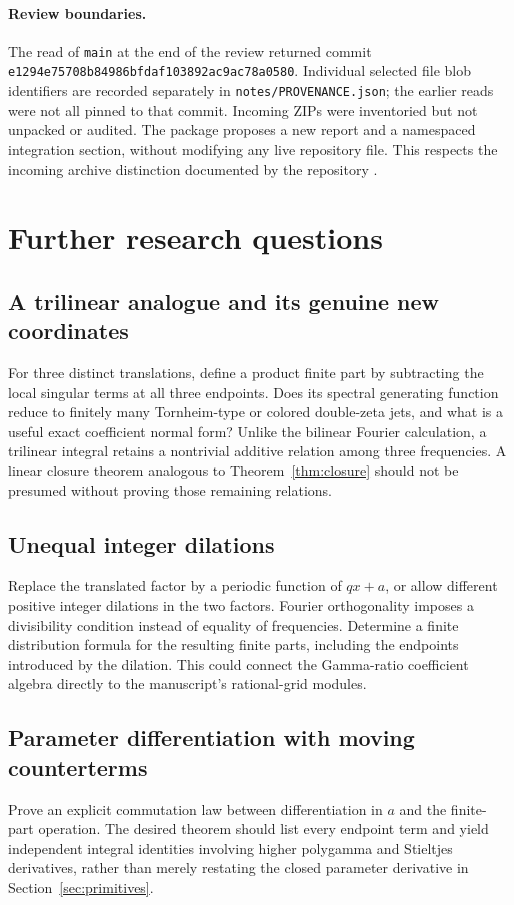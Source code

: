 \documentclass[11pt]{article}
\numberwithin{equation}{section}
\theoremstyle{definition}
\theoremstyle{remark}
\newcommand{\file}[1]{\nolinkurl{#1}}
\begin{document}
\paragraph{Review boundaries.}
The read of \file{main} at the end of the review returned commit
\file{e1294e75708b84986bfdaf103892ac9ac78a0580}.
Individual selected file blob identifiers are recorded separately in
\file{notes/PROVENANCE.json}; the earlier reads were not all pinned to
that commit. Incoming ZIPs were inventoried but not unpacked or audited.
The package proposes a new report and a namespaced integration section,
without modifying any live repository file. This respects the incoming
archive distinction documented by the repository \cite{repo-incoming}.

\section{Further research questions}
\label{sec:questions}

\subsection{A trilinear analogue and its genuine new coordinates}
For three distinct translations, define a product finite part by
subtracting the local singular terms at all three endpoints. Does its
spectral generating function reduce to finitely many Tornheim-type or
colored double-zeta jets, and what is a useful exact coefficient normal
form? Unlike the bilinear Fourier calculation, a trilinear integral
retains a nontrivial additive relation among three frequencies. A
linear closure theorem analogous to Theorem~\ref{thm:closure} should not
be presumed without proving those remaining relations.

\subsection{Unequal integer dilations}
Replace the translated factor by a periodic function of $qx+a$, or
allow different positive integer dilations in the two factors. Fourier
orthogonality imposes a divisibility condition instead of equality of
frequencies. Determine a finite distribution formula for the resulting
finite parts, including the endpoints introduced by the dilation. This
could connect the Gamma-ratio coefficient algebra directly to the
manuscript's rational-grid modules.

\subsection{Parameter differentiation with moving counterterms}
Prove an explicit commutation law between differentiation in $a$ and the
finite-part operation. The desired theorem should list every endpoint
term and yield independent integral identities involving higher
polygamma and Stieltjes derivatives, rather than merely restating the
closed parameter derivative in Section~\ref{sec:primitives}.
\end{document}
